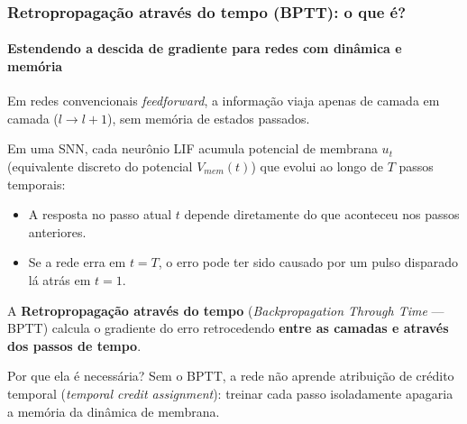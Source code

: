 \begin{frame}
	\frametitle{Retropropagação através do tempo (BPTT): o que é?}
	\framesubtitle{Estendendo a descida de gradiente para redes com dinâmica e memória}
	\small
	\par Em redes convencionais \textit{feedforward}, a informação viaja apenas de camada em camada ($l \to l+1$), sem memória de estados passados.
	\par Em uma SNN, cada neurônio LIF acumula potencial de membrana $u_t$ (equivalente discreto do potencial $V_{mem}(t)$) que evolui ao longo de $T$ passos temporais:
	\begin{itemize}
		\item A resposta no passo atual $t$ depende diretamente do que aconteceu nos passos anteriores.
		\item Se a rede erra em $t=T$, o erro pode ter sido causado por um pulso disparado lá atrás em $t=1$.
	\end{itemize}
	\par A \textbf{Retropropagação através do tempo} (\textit{Backpropagation Through Time} --- BPTT) calcula o gradiente do erro retrocedendo \textbf{entre as camadas e através dos passos de tempo}.
	\begin{block}{Por que ela é necessária?}
		Sem o BPTT, a rede não aprende atribuição de crédito temporal (\textit{temporal credit assignment}): treinar cada passo isoladamente apagaria a memória da dinâmica de membrana.
	\end{block}
\end{frame}

